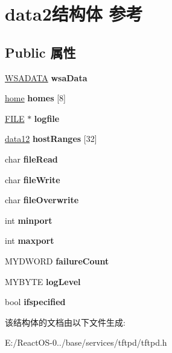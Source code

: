 \hypertarget{structdata2}{}\section{data2结构体 参考}
\label{structdata2}
\subsection*{Public 属性}
\begin{DoxyCompactItemize}
\item 
\mbox{\label{structdata2_abf68da3f3a63067b52eb923e7c5f049e}} 
\hyperlink{struct_w_s_a_data}{W\+S\+A\+D\+A\+TA} {\bfseries wsa\+Data}
\item 
\mbox{\label{structdata2_ad28691ad18d3ae0f576bf07e388b6918}} 
\hyperlink{structhome}{home} {\bfseries homes} \mbox{[}8\mbox{]}
\item 
\mbox{\label{structdata2_ad8f726dab823cdf6babccb62c18f5447}} 
\hyperlink{struct__iobuf}{F\+I\+LE} $\ast$ {\bfseries logfile}
\item 
\mbox{\label{structdata2_a192d4a33ee854b9ce51ab215eb6f9239}} 
\hyperlink{structdata12}{data12} {\bfseries host\+Ranges} \mbox{[}32\mbox{]}
\item 
\mbox{\label{structdata2_a9f38eb8c375a20dc354f3e8f61049894}} 
char {\bfseries file\+Read}
\item 
\mbox{\label{structdata2_a32047d7bc76a5731720dadb00bdeecaa}} 
char {\bfseries file\+Write}
\item 
\mbox{\label{structdata2_a57887725595bd9ab994dc57cdc770f92}} 
char {\bfseries file\+Overwrite}
\item 
\mbox{\label{structdata2_aa0bececceff09ed974e3c61967720a80}} 
int {\bfseries minport}
\item 
\mbox{\label{structdata2_a6ca5d1d2cab6606d2322bbc26fa1a53f}} 
int {\bfseries maxport}
\item 
\mbox{\label{structdata2_acac27260bac1a3073d5e9b2257e78aea}} 
M\+Y\+D\+W\+O\+RD {\bfseries failure\+Count}
\item 
\mbox{\label{structdata2_a56b9f5c2971555ce5a18774a86be5c21}} 
M\+Y\+B\+Y\+TE {\bfseries log\+Level}
\item 
\mbox{\label{structdata2_a3b6b7b25cbdfd8cd465a0ea21cc052e1}} 
bool {\bfseries ifspecified}
\end{DoxyCompactItemize}


该结构体的文档由以下文件生成\+:\begin{DoxyCompactItemize}
\item 
E\+:/\+React\+O\+S-\/0../base/services/tftpd/tftpd.\+h\end{DoxyCompactItemize}
